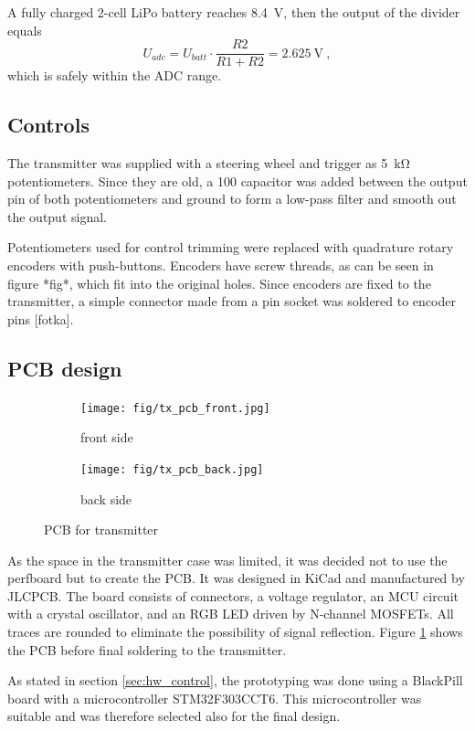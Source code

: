 A fully charged 2-cell LiPo battery reaches \SI{8.4}{\V}, then the output of the divider equals
\begin{equation}
	U_{adc} = U_{batt} \cdot \frac{R2}{R1+R2} = \SI{2.625}{\V}\ ,
\end{equation}
which is safely within the ADC range.

\subsection{Controls}
The transmitter was supplied with a steering wheel and trigger as \SI{5}{\kohm} potentiometers. Since they are old, a \SI{100}{\nF} capacitor was added between the output pin of both potentiometers and ground to form a low-pass filter and smooth out the output signal.

Potentiometers used for control trimming were replaced with quadrature rotary encoders with push-buttons. Encoders have screw threads, as can be seen in figure *fig*, which fit into the original holes. Since encoders are fixed to the transmitter, a simple connector made from a pin socket was soldered to encoder pins [\todo fotka].

\subsection{PCB design}
    \begin{figure}[t]
    \centering
    \begin{subfigure}{0.495\textwidth}
    \centering
        \texttt{[image: fig/tx\_pcb\_front.jpg]}
		\caption{front side}
    \end{subfigure}%
    \hfill
    \begin{subfigure}{0.495\textwidth}
    \centering
		\texttt{[image: fig/tx\_pcb\_back.jpg]}
		\caption{back side}
    \end{subfigure}
	\caption{PCB for transmitter}
    \label{fig:tx_pcb}
    \end{figure}

As the space in the transmitter case was limited, it was decided not to use the perfboard but to create the PCB. It was designed in KiCad and manufactured by JLCPCB. The board consists of connectors, a voltage regulator, an MCU circuit with a crystal oscillator, and an RGB LED driven by N-channel MOSFETs. All traces are rounded to eliminate the possibility of signal reflection. Figure \ref{fig:tx_pcb} shows the PCB before final soldering to the transmitter.

As stated in section \ref{sec:hw_control}, the prototyping was done using a BlackPill board with a microcontroller STM32F303CCT6. This microcontroller was suitable and was therefore selected also for the final design.

